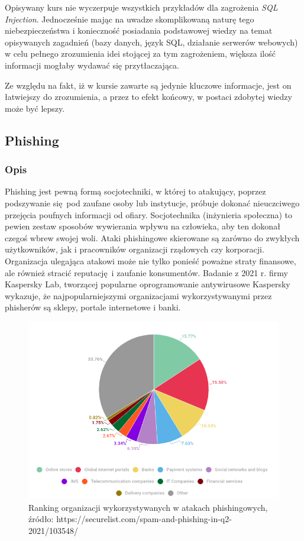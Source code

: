 \documentclass[12pt,twoside]{article}
\begin{document}
Opisywany kurs nie wyczerpuje wszystkich przykładów dla zagrożenia \emph{SQL Injection}. Jednocześnie mając na uwadze skomplikowaną naturę tego niebezpieczeństwa i konieczność posiadania podstawowej wiedzy na temat opisywanych zagadnień (bazy danych, język SQL, działanie serwerów webowych) w celu pełnego zrozumienia idei stojącej za tym zagrożeniem, większa ilość informacji mogłaby wydawać się przytłaczająca. 

Ze względu na fakt, iż w kursie zawarte są jedynie kluczowe informacje, jest on łatwiejszy do zrozumienia, a przez to efekt końcowy, w postaci zdobytej wiedzy może być lepszy.

\clearpage

\subsection{Phishing}
\subsubsection{Opis}
Phishing jest pewną formą socjotechniki, w której to atakujący, poprzez podszywanie się pod zaufane osoby lub instytucje, próbuje dokonać nieuczciwego przejęcia poufnych informacji od ofiary. Socjotechnika (inżynieria społeczna) to pewien zestaw sposobów wywierania wpływu na człowieka, aby ten dokonał czegoś wbrew swojej woli. Ataki phishingowe skierowane są zarówno do zwykłych użytkowników, jak i pracowników organizacji rządowych czy korporacji. Organizacja ulegająca atakowi może nie tylko ponieść poważne straty finansowe, ale również stracić reputację i zaufanie konsumentów. Badanie z 2021 r. firmy Kaspersky Lab, tworzącej popularne oprogramowanie antywirusowe Kaspersky wykazuje, że najpopularniejszymi organizacjami wykorzystywanymi przez phisherów są sklepy, portale internetowe i banki.  \cite{PhishingChart}	

\begin{figure}[H]
	\centering
	\includegraphics[width=0.9\linewidth]{figures/phishing-organisations}
	\caption{Ranking organizacji wykorzystywanych w atakach phishingowych, źródło: https://securelist.com/spam-and-phishing-in-q2-2021/103548/}
	\label{fig:phishing-organisations}
\end{figure}
\end{document}
